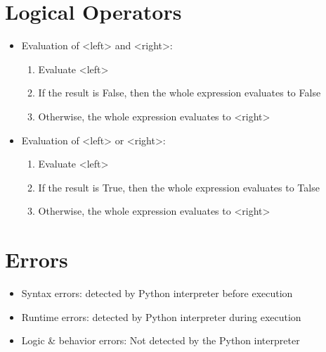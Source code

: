 \section{Logical Operators}
\begin{itemize}
    \item Evaluation of <left> and <right>:
    \begin{enumerate}
		\item Evaluate <left>
		\item If the result is False, then the whole expression evaluates to False
		\item Otherwise, the whole expression evaluates to <right>
	\end{enumerate}
    \item Evaluation of <left> or <right>:
    \begin{enumerate}
		\item Evaluate <left>
		\item If the result is True, then the whole expression evaluates to Talse
		\item Otherwise, the whole expression evaluates to <right>
	\end{enumerate}
\end{itemize}

\section{Errors}
\begin{itemize}
    \item Syntax errors: detected by Python interpreter before execution
    \item Runtime errors: detected by Python interpreter during execution
    \item Logic \& behavior errors: Not detected by the Python interpreter
\end{itemize}

